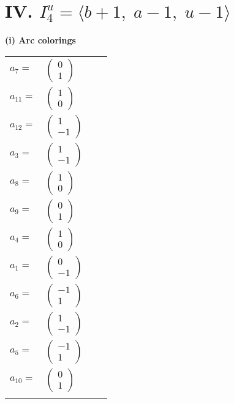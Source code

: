 \documentclass[1p]{elsarticle_modified}
\theoremstyle{definition}
\begin{document}
\centering \section*{IV. $I^u_{4}= \langle b+1,\;a-1,\;u-1 \rangle$}
\flushleft \textbf{(i) Arc colorings}\\
\begin{tabular}{m{7pt} m{180pt} m{7pt} m{180pt} }
\flushright $a_{7}=$&$\begin{pmatrix}0\\1\end{pmatrix}$ \\
\flushright $a_{11}=$&$\begin{pmatrix}1\\0\end{pmatrix}$ \\
\flushright $a_{12}=$&$\begin{pmatrix}1\\-1\end{pmatrix}$ \\
\flushright $a_{3}=$&$\begin{pmatrix}1\\-1\end{pmatrix}$ \\
\flushright $a_{8}=$&$\begin{pmatrix}1\\0\end{pmatrix}$ \\
\flushright $a_{9}=$&$\begin{pmatrix}0\\1\end{pmatrix}$ \\
\flushright $a_{4}=$&$\begin{pmatrix}1\\0\end{pmatrix}$ \\
\flushright $a_{1}=$&$\begin{pmatrix}0\\-1\end{pmatrix}$ \\
\flushright $a_{6}=$&$\begin{pmatrix}-1\\1\end{pmatrix}$ \\
\flushright $a_{2}=$&$\begin{pmatrix}1\\-1\end{pmatrix}$ \\
\flushright $a_{5}=$&$\begin{pmatrix}-1\\1\end{pmatrix}$ \\
\flushright $a_{10}=$&$\begin{pmatrix}0\\1\end{pmatrix}$\\&\end{tabular}
\end{document}
